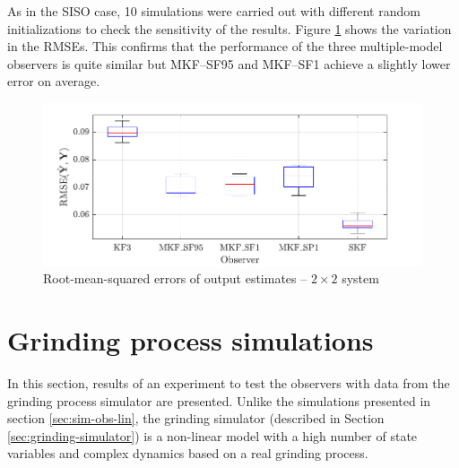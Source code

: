 As in the \gls{SISO} case, 10 simulations were carried out with different random initializations to check the sensitivity of the results. Figure \ref{fig:rod-obs-sim2-yest-all-seed-RMSE-box} shows the variation in the \gls{RMSE}s. This confirms that the performance of the three multiple-model observers is quite similar but MKF--SF95 and MKF--SF1 achieve a slightly lower error on average.
\begin{figure}[htp]
	\centering
	\includegraphics[width=12cm]{images/rod_obs_sim3_all_seed_y_err_box.pdf}
	\caption{Root-mean-squared errors of output estimates – $2\times2$ system}
	\label{fig:rod-obs-sim2-yest-all-seed-RMSE-box}
\end{figure}

\section{Grinding process simulations} \label{sec:sim-ore-SISO}

In this section, results of an experiment to test the observers with data from the grinding process simulator are presented. Unlike the simulations presented in section \ref{sec:sim-obs-lin}, the grinding simulator (described in Section \ref{sec:grinding-simulator}) is a non-linear model with a high number of state variables and complex dynamics based on a real grinding process.

